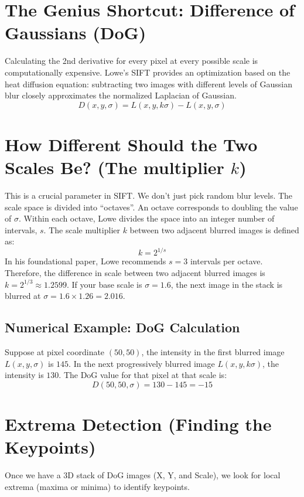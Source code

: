 \documentclass{report}
\begin{document}
\section{The Genius Shortcut: Difference of Gaussians (DoG)}
Calculating the 2nd derivative for every pixel at every possible scale is computationally expensive. Lowe's SIFT provides an optimization based on the heat diffusion equation: subtracting two images with different levels of Gaussian blur closely approximates the normalized Laplacian of Gaussian.
\begin{equation}
    D(x,y,\sigma) = L(x,y,k\sigma) - L(x,y,\sigma)
\end{equation}

\section{How Different Should the Two Scales Be? (The multiplier $k$)}
This is a crucial parameter in SIFT. We don't just pick random blur levels. The scale space is divided into ``octaves''. An octave corresponds to doubling the value of $\sigma$.
Within each octave, Lowe divides the space into an integer number of intervals, $s$. The scale multiplier $k$ between two adjacent blurred images is defined as:
\begin{equation}
    k = 2^{1/s}
\end{equation}
In his foundational paper, Lowe recommends $s = 3$ intervals per octave. Therefore, the difference in scale between two adjacent blurred images is $k = 2^{1/3} \approx 1.2599$.
If your base scale is $\sigma = 1.6$, the next image in the stack is blurred at $\sigma = 1.6 \times 1.26 = 2.016$.

\subsection{Numerical Example: DoG Calculation}
Suppose at pixel coordinate $(50, 50)$, the intensity in the first blurred image $L(x,y,\sigma)$ is $145$. In the next progressively blurred image $L(x,y,k\sigma)$, the intensity is $130$. The DoG value for that pixel at that scale is:
\begin{equation}
    D(50,50,\sigma) = 130 - 145 = -15
\end{equation}

\section{Extrema Detection (Finding the Keypoints)}
Once we have a 3D stack of DoG images (X, Y, and Scale), we look for local extrema (maxima or minima) to identify keypoints.
\end{document}
